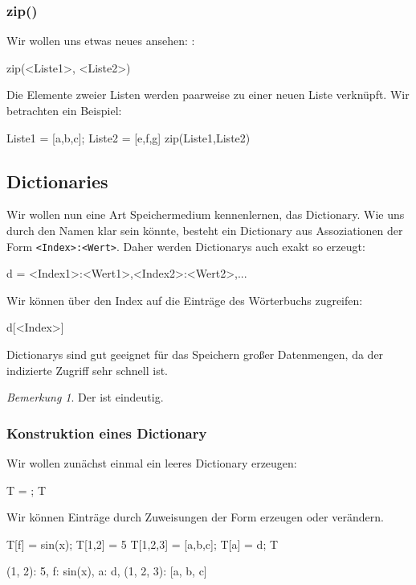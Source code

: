 \documentclass[fontsize=12pt,paper=a4,twoside,bibtotoc,idxtotoc,
liststotoc,pagesize,BCOR1.2cm,DIV15,chapterprefix,pagesize=pdftex]{scrbook}
\theoremstyle{plain}
\theoremstyle{definition}
\theoremstyle{remark}
\newtheorem{bem}[equation]{Bemerkung}
\begin{document}
\subsubsection{zip()}
Wir wollen uns etwas neues ansehen: :
\begin{sagein}
zip(<Liste1>, <Liste2>) 
\end{sagein}
Die Elemente zweier Listen werden paarweise zu einer neuen Liste verknüpft.
Wir betrachten ein Beispiel:
\begin{sagein}
Liste1 = [a,b,c]; Liste2 = [e,f,g]
zip(Liste1,Liste2)
\end{sagein}
\begin{sageout}
[(a, e), (b, f), (c, g)]
\end{sageout}
\subsection{Dictionaries}
Wir wollen nun eine Art Speichermedium kennenlernen, das Dictionary. Wie uns durch den Namen klar sein könnte, besteht ein Dictionary aus Assoziationen der Form \verb+<Index>:<Wert>+. 
Daher werden Dictionarys auch exakt so erzeugt:
\begin{sagein}
d = {<Index1>:<Wert1>,<Index2>:<Wert2>,...}
\end{sagein}
Wir können über den Index auf die Einträge des Wörterbuchs zugreifen:
\begin{sagein}
d[<Index>]
\end{sagein}
Dictionarys sind gut geeignet für das Speichern großer Datenmengen, da der indizierte Zugriff sehr schnell ist.
\begin{bem}
 Der  ist eindeutig.
\end{bem}
\subsubsection{Konstruktion eines Dictionary}
Wir wollen zunächst einmal ein leeres Dictionary erzeugen:
\begin{sagein}
T = {}; T
\end{sagein}
\begin{sageout}
  {}
\end{sageout}
Wir können Einträge durch Zuweisungen der Form  erzeugen oder verändern. 
\begin{sagein}
T[f] = sin(x); T[1,2] = 5
T[1,2,3] = [a,b,c]; T[a] = d;
T
\end{sagein}
\begin{sageout}
{(1, 2): 5, f: sin(x), a: d, (1, 2, 3): [a, b, c]}
\end{sageout}
\end{document}
